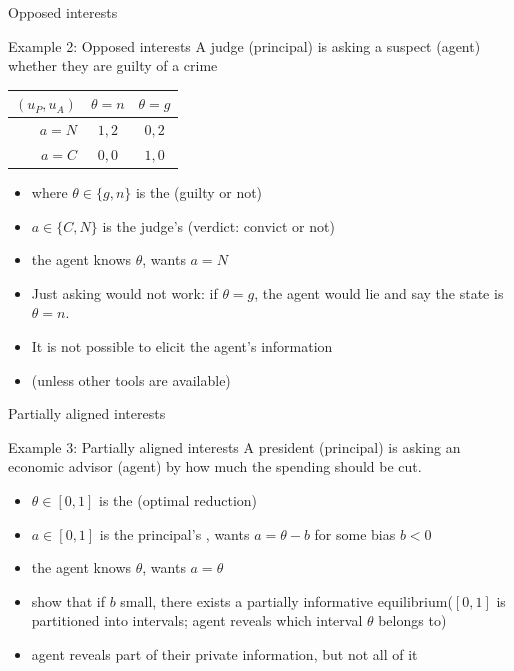 \documentclass[english,10pt
,aspectratio=169
]{beamer}
\begin{document}
\begin{frame}{Opposed interests}
	\begin{exampleblock}{Example 2: Opposed interests}
		A judge (principal) is asking a suspect (agent) whether they are guilty of a crime
		\begin{center}
			\begin{tabular}{r | c | c |}
				$(u_P,u_A)$	& $\theta=n$	& $\theta=g$
				\\ \hline 
				$a=N$ 		& $1,2$			& $0,2$
				\\ \hline
				$a=C$		& $0,0$			& $1,0$
				\\ \hline 
			\end{tabular}
		\end{center}
	\end{exampleblock}
	
	\begin{itemize}
		\item where $\theta\in \{g,n\}$ is the  (guilty or not)
		\item $a \in \{C,N\}$ is the judge's  (verdict: convict or not)
		\item the agent knows $\theta$, wants $a=N$
		\pause \bigskip 
		\item Just asking would not work: if $\theta=g$, \alert<2>{the agent would lie} and say the state is $\theta=n$.
		\item It is \alert<2>{not possible} to elicit the agent's information
		\item (unless other tools are available)
	\end{itemize}
\end{frame}


\begin{frame}{Partially aligned interests}
	\begin{exampleblock}{Example 3: Partially aligned interests}
		A president (principal) is asking an economic advisor (agent) by how much the spending should be cut.
	\end{exampleblock}
	
	\begin{itemize}
		\item $\theta\in [0,1]$ is the  (optimal reduction)
		\item $a \in [0,1]$ is the principal's , wants $a=\theta-b$ for some bias $b<0$
		\item the agent knows $\theta$, wants $a=\theta$
		\pause \bigskip 
		\item \cite{crawford_strategic_1982} show that if $b$ small, there exists a \alert<2>{partially informative} equilibrium($[0,1]$ is partitioned into intervals; agent reveals which interval $\theta$ belongs to)
		\item agent \alert{reveals part} of their private information, but not all of it
	\end{itemize}
\end{frame}
\end{document}
